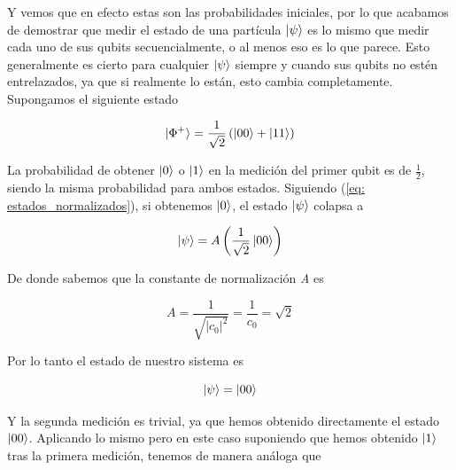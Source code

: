 \documentclass[12pt]{article}
\numberwithin{equation}{section} %
\begin{document}
    \vspace{2.5mm}

    Y vemos que en efecto estas son las probabilidades iniciales, por lo que acabamos de demostrar que medir el estado de una partícula \( \ket{\psi} \) es lo mismo que medir cada uno de sus qubits secuencialmente, o al menos eso es lo que parece. Esto generalmente es cierto para cualquier \( \ket{\psi} \) siempre y cuando sus qubits no estén entrelazados, ya que si realmente lo están, esto cambia completamente. Supongamos el siguiente estado

    \begin{equation*}
        \ket{\Phi^{+}} = \frac{1}{\sqrt{2}} \left( \ket{0 0} + \ket{1 1} \right)
    \end{equation*}

    \vspace{2.5mm}

    La probabilidad de obtener \( \ket{0} \) o \( \ket{1} \) en la medición del primer qubit es de \( \frac{1}{2} \), siendo la misma probabilidad para ambos estados. Siguiendo (\ref{eq: estados_normalizados}), si obtenemos \( \ket{0} \), el estado \( \ket{\psi} \) colapsa a 

    \begin{equation*}
        \ket{\psi} = A \left( \frac{1}{\sqrt{2}} \ket{0 0} \right)
    \end{equation*}

    \vspace{2.5mm}

    De donde sabemos que la constante de normalización \textit{A} es

    \begin{equation*}
        A = \frac{1}{\sqrt{| c_{0} |^{2}}} = \frac{1}{c_{0}} = \sqrt{2}
    \end{equation*}

    \vspace{2.5mm}

    Por lo tanto el estado de nuestro sistema es

    \begin{equation*}
        \ket{\psi} = \ket{0 0}
    \end{equation*}

    \vspace{2.5mm}

    Y la segunda medición es trivial, ya que hemos obtenido directamente el estado \( \ket{0 0} \). Aplicando lo mismo pero en este caso suponiendo que hemos obtenido \( \ket{1} \) tras la primera medición, tenemos de manera análoga que
\end{document}
